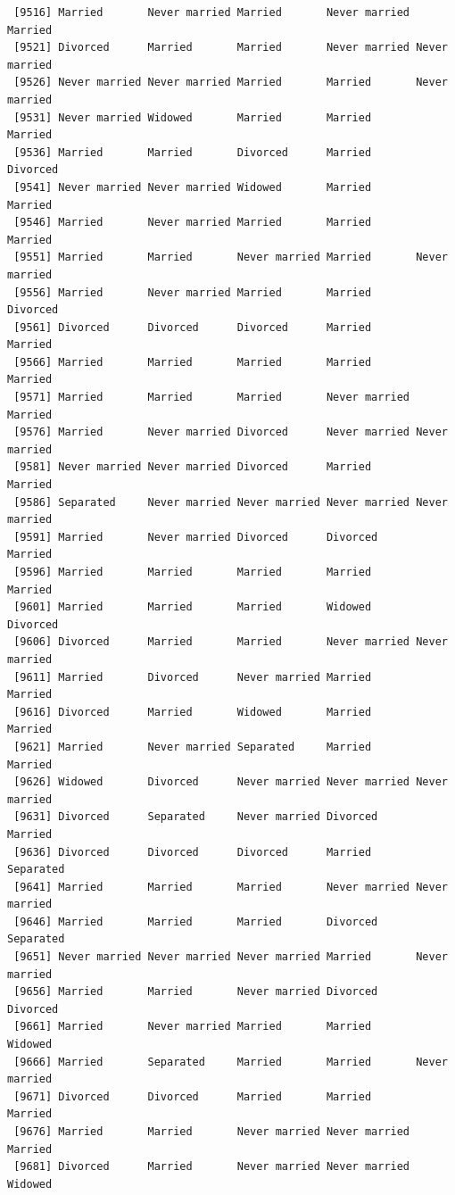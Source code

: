 \documentclass[
  letterpaper,
  DIV=11,
  numbers=noendperiod,
  oneside]{scrartcl}
\begin{document}
\begin{verbatim}
 [9516] Married       Never married Married       Never married Married      
 [9521] Divorced      Married       Married       Never married Never married
 [9526] Never married Never married Married       Married       Never married
 [9531] Never married Widowed       Married       Married       Married      
 [9536] Married       Married       Divorced      Married       Divorced     
 [9541] Never married Never married Widowed       Married       Married      
 [9546] Married       Never married Married       Married       Married      
 [9551] Married       Married       Never married Married       Never married
 [9556] Married       Never married Married       Married       Divorced     
 [9561] Divorced      Divorced      Divorced      Married       Married      
 [9566] Married       Married       Married       Married       Married      
 [9571] Married       Married       Married       Never married Married      
 [9576] Married       Never married Divorced      Never married Never married
 [9581] Never married Never married Divorced      Married       Married      
 [9586] Separated     Never married Never married Never married Never married
 [9591] Married       Never married Divorced      Divorced      Married      
 [9596] Married       Married       Married       Married       Married      
 [9601] Married       Married       Married       Widowed       Divorced     
 [9606] Divorced      Married       Married       Never married Never married
 [9611] Married       Divorced      Never married Married       Married      
 [9616] Divorced      Married       Widowed       Married       Married      
 [9621] Married       Never married Separated     Married       Married      
 [9626] Widowed       Divorced      Never married Never married Never married
 [9631] Divorced      Separated     Never married Divorced      Married      
 [9636] Divorced      Divorced      Divorced      Married       Separated    
 [9641] Married       Married       Married       Never married Never married
 [9646] Married       Married       Married       Divorced      Separated    
 [9651] Never married Never married Never married Married       Never married
 [9656] Married       Married       Never married Divorced      Divorced     
 [9661] Married       Never married Married       Married       Widowed      
 [9666] Married       Separated     Married       Married       Never married
 [9671] Divorced      Divorced      Married       Married       Married      
 [9676] Married       Married       Never married Never married Married      
 [9681] Divorced      Married       Never married Never married Widowed      

\end{verbatim}
\end{document}
